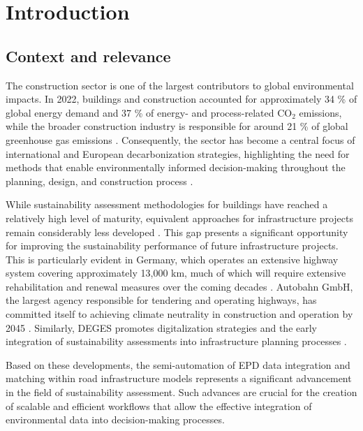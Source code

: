 \documentclass[10pt, a4paper, twocolumn]{article}
\begin{document}
\section{Introduction}

\subsection{Context and relevance}

The construction sector is one of the largest  contributors to global environmental impacts. In 2022, buildings and construction accounted for approximately 34 \% of global energy demand and 37 \% of energy- and process-related CO$_2$ emissions, while the broader construction industry is responsible for around 21 \% of global greenhouse gas emissions \cite{UN report}. Consequently, the sector has become a central focus of international and European decarbonization strategies, highlighting the need for methods that enable environmentally informed decision-making throughout the planning, design,  and construction process \cite{Chen.2024}.

While sustainability assessment methodologies for buildings have reached a relatively high level of maturity, equivalent approaches for infrastructure projects remain considerably less developed \cite{Milic.2024}. This gap presents a significant opportunity for improving the sustainability performance of future infrastructure projects. This is particularly evident in Germany, which operates an extensive highway system covering approximately 13,000 km, much of which will require extensive rehabilitation and renewal measures over the coming decades \cite{FederalMinistryofTransport.2025}. Autobahn GmbH, the largest agency responsible for tendering and operating highways, has committed itself to achieving climate neutrality in construction and operation by 2045 \cite{AutobahnGmbH.}. Similarly, DEGES promotes digitalization strategies and the early integration of sustainability assessments into infrastructure planning processes \cite{DEGES.2025}.

Based on these developments, the semi-automation of EPD data integration and matching within road infrastructure models represents a significant advancement in the field of sustainability assessment. Such advances are crucial for the creation of scalable and efficient workflows that allow the effective integration of environmental data into decision-making processes.
\end{document}
